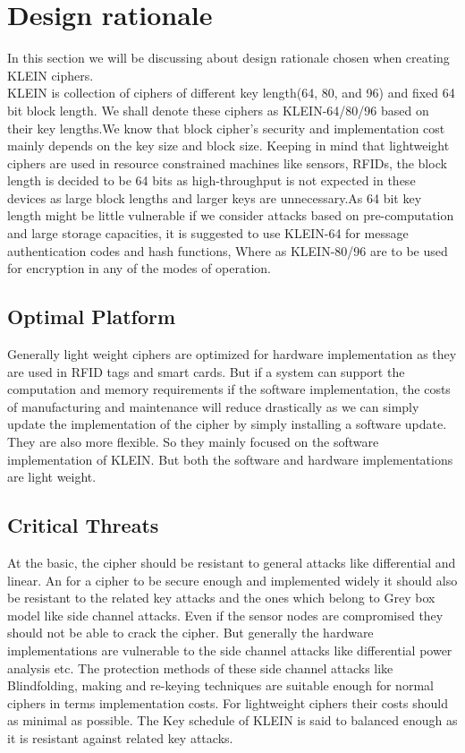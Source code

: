 \documentclass[preprint]{transcrypto}
\begin{document}
\section{Design rationale}
In this section we will be discussing about design rationale chosen when creating KLEIN ciphers.
\\
KLEIN is collection of ciphers of different key length(64, 80, and 96) and fixed 64 bit block length.
We shall denote these ciphers as KLEIN-64/80/96 based on their key lengths.We know that block cipher's security and implementation cost mainly depends on the key size and block size. Keeping in mind that lightweight ciphers are used in resource constrained machines like sensors, RFIDs, the block length is decided to be 64 bits as high-throughput is not expected in these devices as large block lengths and larger keys are unnecessary.As 64 bit key length might be little vulnerable if we consider attacks based on pre-computation and large storage capacities, it is suggested to use KLEIN-64 for message authentication codes and hash functions, Where as KLEIN-80/96 are to be used for encryption in any of the modes of operation.\\

\subsection{Optimal Platform} Generally light weight ciphers are optimized for hardware implementation as they are used in RFID tags and smart cards. But if a system can support the computation and memory requirements if the software implementation, the costs of manufacturing and maintenance will reduce drastically as we can simply update the implementation of the cipher by simply installing a software update. They are also more flexible. So they mainly focused on the software implementation of KLEIN. 
But both the software and hardware implementations are light weight.\\
\subsection{Critical Threats}
At the basic, the cipher should be resistant to general attacks like differential and linear. An for a cipher to be secure enough and implemented widely it should also be resistant to the related key attacks and the ones which belong to Grey box model like side channel attacks. Even if the sensor nodes are compromised they should not be able to crack the cipher. But generally the hardware implementations are vulnerable to the side channel attacks like differential power analysis etc. The protection methods of these side channel attacks like Blindfolding, making and re-keying techniques are suitable enough for normal ciphers in terms implementation costs. For lightweight ciphers their costs should as minimal as possible. The Key schedule of KLEIN is said to balanced enough as it is resistant against related key attacks. \\
\end{document}
